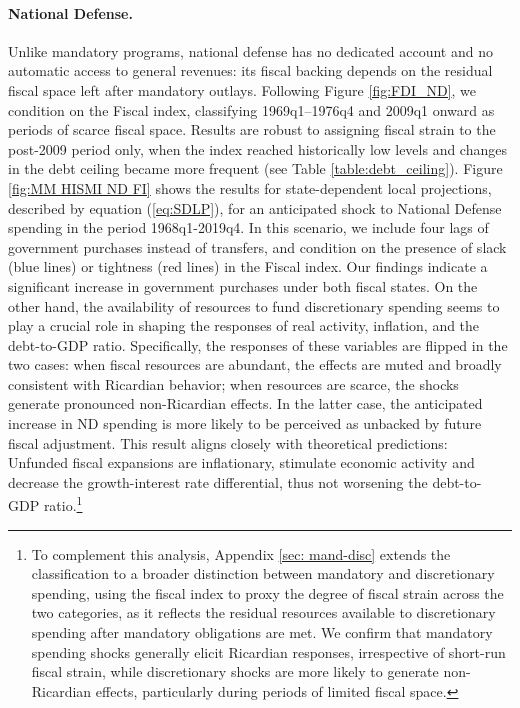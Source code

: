 \documentclass[12pt]{article}%
\theoremstyle{remark}
\begin{document}
\paragraph{National Defense.} Unlike mandatory programs, national defense has no dedicated account and no automatic access to general revenues: its fiscal backing depends on the residual fiscal space left after mandatory outlays. Following Figure \ref{fig:FDI_ND}, we condition on the Fiscal index, classifying 1969q1–1976q4 and 2009q1 onward as periods of scarce fiscal space. Results are robust to assigning fiscal strain to the post-2009 period only, when the index reached historically low levels and changes in the debt ceiling became more frequent (see Table \ref{table:debt_ceiling}).
Figure \ref{fig:MM HISMI ND FI} shows the results for state-dependent local projections, described by equation (\ref{eq:SDLP}), for an anticipated shock to National Defense spending in the period 1968q1-2019q4.
In this scenario, we include four lags of government purchases instead of transfers, and condition on the presence of slack (blue lines) or tightness (red lines) in the Fiscal index.
Our findings indicate a significant increase in government purchases under both fiscal states. On the other hand, the availability of resources to fund discretionary spending seems to play a crucial role in shaping the responses of real activity, inflation, and the debt-to-GDP ratio. Specifically, the responses of these variables are flipped in the two cases: when fiscal resources are abundant, the effects are muted and broadly consistent with Ricardian behavior; when resources are scarce, the shocks generate pronounced non-Ricardian effects. In the latter case, the anticipated increase in ND spending is more likely to be perceived as unbacked by future fiscal adjustment. This result aligns closely with theoretical predictions: Unfunded fiscal expansions are inflationary, stimulate economic activity and decrease the growth-interest rate differential, thus not worsening the debt-to-GDP ratio.\footnote{To complement this analysis, Appendix \ref{sec: mand-disc} extends the classification to a broader distinction between mandatory and discretionary spending, using the fiscal index to proxy the degree of fiscal strain across the two categories, as it reflects the residual resources available to discretionary spending after mandatory obligations are met. We confirm that mandatory spending shocks generally elicit Ricardian responses, irrespective of short-run fiscal strain, while discretionary shocks are more likely to generate non-Ricardian effects, particularly during periods of limited fiscal space.}
 
\end{document}
